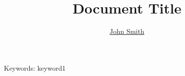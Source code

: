 \documentclass{article}
\title{Document Title}
\author{\href{john.s@mail.com}{John Smith}}
\affil{University of Mordor, Middle-earth}
\providecommand{\keywords}[1]{{Keywords:} #1}
\begin{document}
	\maketitle
	
	\keywords{keyword1}
\end{document}
